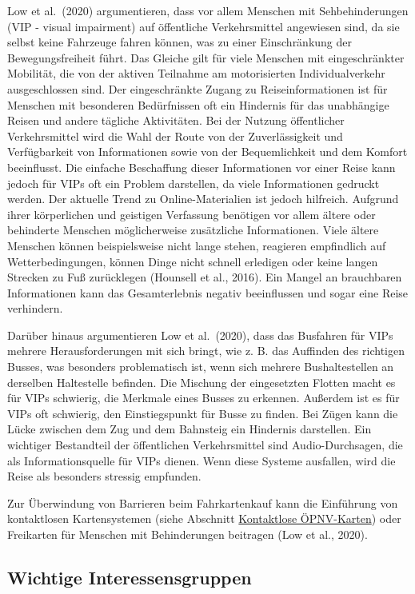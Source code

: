 \documentclass[
]{book}
\begin{document}
Low et al.~(2020) argumentieren, dass vor allem Menschen mit Sehbehinderungen (VIP - visual impairment) auf öffentliche Verkehrsmittel angewiesen sind, da sie selbst keine Fahrzeuge fahren können, was zu einer Einschränkung der Bewegungsfreiheit führt. Das Gleiche gilt für viele Menschen mit eingeschränkter Mobilität, die von der aktiven Teilnahme am motorisierten Individualverkehr ausgeschlossen sind. Der eingeschränkte Zugang zu Reiseinformationen ist für Menschen mit besonderen Bedürfnissen oft ein Hindernis für das unabhängige Reisen und andere tägliche Aktivitäten. Bei der Nutzung öffentlicher Verkehrsmittel wird die Wahl der Route von der Zuverlässigkeit und Verfügbarkeit von Informationen sowie von der Bequemlichkeit und dem Komfort beeinflusst. Die einfache Beschaffung dieser Informationen vor einer Reise kann jedoch für VIPs oft ein Problem darstellen, da viele Informationen gedruckt werden. Der aktuelle Trend zu Online-Materialien ist jedoch hilfreich. Aufgrund ihrer körperlichen und geistigen Verfassung benötigen vor allem ältere oder behinderte Menschen möglicherweise zusätzliche Informationen. Viele ältere Menschen können beispielsweise nicht lange stehen, reagieren empfindlich auf Wetterbedingungen, können Dinge nicht schnell erledigen oder keine langen Strecken zu Fuß zurücklegen (Hounsell et al., 2016). Ein Mangel an brauchbaren Informationen kann das Gesamterlebnis negativ beeinflussen und sogar eine Reise verhindern.

Darüber hinaus argumentieren Low et al.~(2020), dass das Busfahren für VIPs mehrere Herausforderungen mit sich bringt, wie z. B. das Auffinden des richtigen Busses, was besonders problematisch ist, wenn sich mehrere Bushaltestellen an derselben Haltestelle befinden. Die Mischung der eingesetzten Flotten macht es für VIPs schwierig, die Merkmale eines Busses zu erkennen. Außerdem ist es für VIPs oft schwierig, den Einstiegspunkt für Busse zu finden. Bei Zügen kann die Lücke zwischen dem Zug und dem Bahnsteig ein Hindernis darstellen. Ein wichtiger Bestandteil der öffentlichen Verkehrsmittel sind Audio-Durchsagen, die als Informationsquelle für VIPs dienen. Wenn diese Systeme ausfallen, wird die Reise als besonders stressig empfunden.

Zur Überwindung von Barrieren beim Fahrkartenkauf kann die Einführung von kontaktlosen Kartensystemen (siehe Abschnitt \protect\hyperlink{contactless_cards}{Kontaktlose ÖPNV-Karten}) oder Freikarten für Menschen mit Behinderungen beitragen (Low et al., 2020).

\hypertarget{wichtige-interessensgruppen-27}{%
\subsection*{Wichtige Interessensgruppen}\label{wichtige-interessensgruppen-27}}
\end{document}
